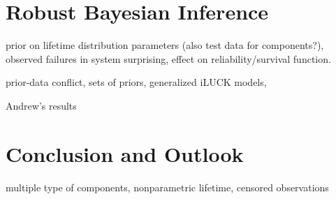 \documentclass[authoryear]{elsarticle}
\begin{document}
\section{Robust Bayesian Inference}

prior on lifetime distribution parameters (also test data for components?),
observed failures in system surprising,
effect on reliability/survival function.

prior-data conflict, sets of priors,
generalized iLUCK models, 

Andrew's results


\section{Conclusion and Outlook}


multiple type of components, nonparametric lifetime, censored observations 
\end{document}
